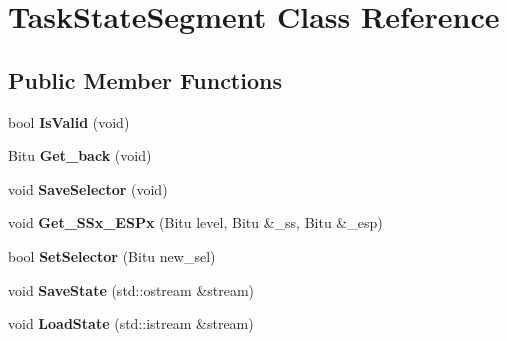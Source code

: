 \hypertarget{classTaskStateSegment}{\section{Task\-State\-Segment Class Reference}
\label{classTaskStateSegment}
}
\subsection*{Public Member Functions}
\begin{DoxyCompactItemize}
\item 
\hypertarget{classTaskStateSegment_a480f0d578b5cad917f264fab837fc42b}{bool {\bfseries Is\-Valid} (void)}\label{classTaskStateSegment_a480f0d578b5cad917f264fab837fc42b}

\item 
\hypertarget{classTaskStateSegment_abab719b79044e21fe8d0e97db0e08ac8}{Bitu {\bfseries Get\-\_\-back} (void)}\label{classTaskStateSegment_abab719b79044e21fe8d0e97db0e08ac8}

\item 
\hypertarget{classTaskStateSegment_a30b6e12cc5d6e7238bb3bedb524070d9}{void {\bfseries Save\-Selector} (void)}\label{classTaskStateSegment_a30b6e12cc5d6e7238bb3bedb524070d9}

\item 
\hypertarget{classTaskStateSegment_a586fbc301e4ed043ff95a7bcb4d07542}{void {\bfseries Get\-\_\-\-S\-Sx\-\_\-\-E\-S\-Px} (Bitu level, Bitu \&\-\_\-ss, Bitu \&\-\_\-esp)}\label{classTaskStateSegment_a586fbc301e4ed043ff95a7bcb4d07542}

\item 
\hypertarget{classTaskStateSegment_a1388c346bdd42dbe83aa62e510c80239}{bool {\bfseries Set\-Selector} (Bitu new\-\_\-sel)}\label{classTaskStateSegment_a1388c346bdd42dbe83aa62e510c80239}

\item 
\hypertarget{classTaskStateSegment_a78a9cd7287ed676e972c120286d8873e}{void {\bfseries Save\-State} (std\-::ostream \&stream)}\label{classTaskStateSegment_a78a9cd7287ed676e972c120286d8873e}

\item 
\hypertarget{classTaskStateSegment_a56f5dafd7c0509706bc989be48179d41}{void {\bfseries Load\-State} (std\-::istream \&stream)}\label{classTaskStateSegment_a56f5dafd7c0509706bc989be48179d41}

\end{DoxyCompactItemize}
